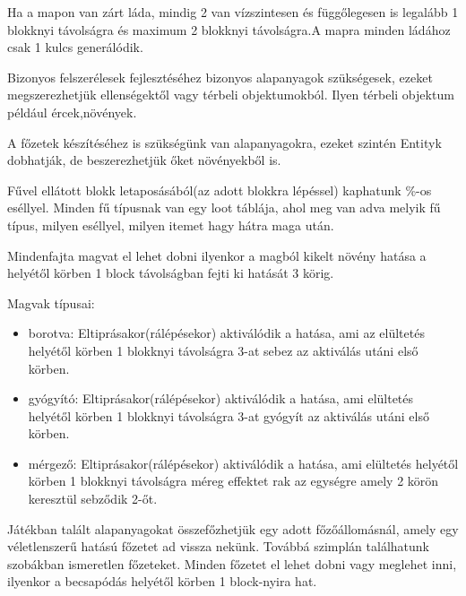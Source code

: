 
Ha a mapon van zárt láda, mindig 2 van vízszintesen és függőlegesen is legalább 1 blokknyi távolságra és maximum 2 blokknyi távolságra.A mapra minden ládához csak 1 kulcs generálódik.



Bizonyos felszerélesek fejlesztéséhez bizonyos alapanyagok szükségesek, ezeket megszerezhetjük ellenségektől vagy térbeli objektumokból.
Ilyen térbeli objektum például ércek,növények.

A főzetek készítéséhez is szükségünk van alapanyagokra, ezeket szintén Entityk dobhatják, de beszerezhetjük őket növényekből is.


Fűvel ellátott blokk letaposásából(az adott blokkra lépéssel) kaphatunk \%-os eséllyel.
Minden fű típusnak van egy loot táblája, ahol meg van adva melyik fű típus, milyen eséllyel, milyen itemet hagy hátra maga után.

Mindenfajta magvat el lehet dobni ilyenkor a magból kikelt növény hatása a helyétől körben 1 block távolságban fejti ki hatását 3 körig.

Magvak típusai:

\begin{itemize}
\item borotva: Eltiprásakor(rálépésekor) aktiválódik a hatása, ami az elültetés helyétől körben 1 blokknyi távolságra 3-at sebez az aktiválás utáni első körben.
\item gyógyító: Eltiprásakor(rálépésekor) aktiválódik a hatása, ami elültetés helyétől körben 1 blokknyi távolságra 3-at gyógyít az aktiválás utáni első körben.
\item mérgező: Eltiprásakor(rálépésekor) aktiválódik a hatása, ami elültetés helyétől körben 1 blokknyi távolságra méreg effektet rak az egységre amely 2 körön keresztül sebződik 2-őt.
\end{itemize}



Játékban talált alapanyagokat összefőzhetjük egy adott főzőállomásnál, amely egy véletlenszerű hatású főzetet ad vissza nekünk.
Továbbá szimplán találhatunk szobákban ismeretlen főzeteket.
Minden főzetet el lehet dobni vagy meglehet inni, ilyenkor a becsapódás helyétől körben 1 block-nyira hat.

